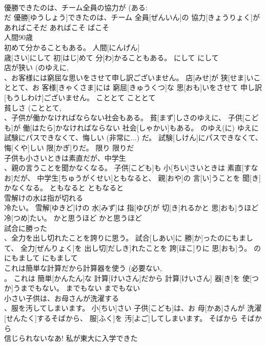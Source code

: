 \documentclass[8pt]{extreport}
\begin{document}
\begin{CJK}{UTF8}{min}
\\	優勝できたのは、チーム全員の協力が (ある: 
\\	だ	優勝[ゆうしょう]できたのは、チーム 全員[ぜんいん]の 協力[きょうりょく]があればこそだ	あればこそ	ばこそ	
\\	人間90歳 
\\	初めて分かることもある。	人間[にんげん] 
\\	歳[さい]にして 初[はじ]めて 分[わ]かることもある。	にして	にして	
\\	店が狭い (のゆえに, 
\\	、お客様には窮屈な思いをさせて申し訳ございません。	店[みせ]が 狭[せま]いこととて、お 客様[きゃくさま]には 窮屈[きゅうくつ]な 思[おも]いをさせて 申し訳[もうしわけ]ございません。	こととて	こととて	
\\	貧しさ (こととて, 
\\	、子供が働かなければならない社会もある。	貧[まず]しさのゆえに、 子供[こども]が 働[はたら]かなければならない 社会[しゃかい]もある。	のゆえ(に)	ゆえに	
\\	試験にパスできなくて、悔しい (非常に...) だ。	試験[しけん]にパスできなくて、 悔[くや]しい 限[かぎ]りだ。	限り	限りだ	
\\	子供も小さいときは素直だが、中学生 
\\	、親の言うことを聞かなくなる。	子供[こども]も 小[ちい]さいときは 素直[すなお]だが、 中学生[ちゅうがくせい]ともなると、 親[おや]の 言[い]うことを 聞[き]かなくなる。	ともなると	ともなると	
\\	雪解けの水は指が切れる 
\\	冷たい。	雪解[ゆきど]けの 水[みず]は 指[ゆび]が 切[き]れるかと 思[おも]うほど 冷[つめ]たい。	かと思うほど	かと思うほど	
\\	試合に勝った
\\	、全力を出し切れたことを誇りに思う。	試合[しあい]に 勝[か]ったのにもまして、 全力[ぜんりょく]を 出し切[だしき]れたことを 誇[ほこ]りに 思[おも]う。	のにもまして	にもまして	
\\	これは簡単な計算だから計算器を使う (必要ない, 
\\	。	これは 簡単[かんたん]な 計算[けいさん]だから 計算[けいさん] 器[き]を 使[つか]うまでもない。	までもない	までもない	
\\	小さい子供は、お母さんが洗濯する 
\\	、服を汚してしまいます。	小[ちい]さい 子供[こども]は、お 母[かあ]さんが 洗濯[せんたく]するそばから、 服[ふく]を 汚[よご]してしまいます。	そばから	そばから	
\\	信じられないなあ! 私が東大に入学できた 

\end{CJK}
\end{document}

